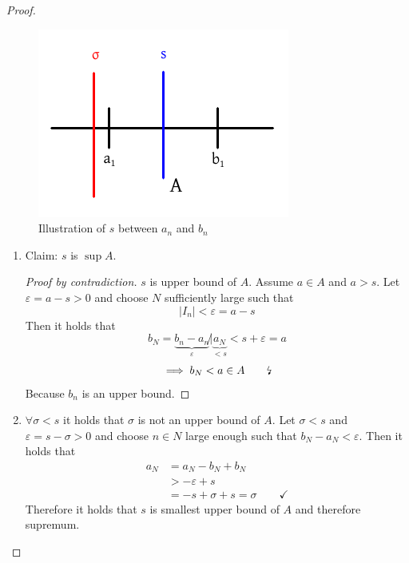 \documentclass[a4paper,landscape,twocolumn]{article}
\theoremstyle{definition}
\newcommand\abs[1]{\left|#1\right|}
\begin{document}
\begin{proof}
  \begin{figure}[!h]
    \begin{center}
      \includegraphics{img/proof_interval2.pdf}
      \caption[width=200pt]{Illustration of $s$ between $a_n$ and $b_n$}
    \end{center}
  \end{figure}

  \begin{enumerate}
    \item
      Claim: $s$ is $\sup{A}$.

      \begin{proof}[Proof by contradiction]
        $s$ is upper bound of $A$. Assume $a \in A$ and $a > s$.
        Let $\varepsilon = a - s > 0$ and choose $N$ sufficiently large such that
        \[ \abs{I_n} < \varepsilon = a - s \]
        Then it holds that
        \[
            b_N
            = \underbrace{b_n - a_n}_{\varepsilon} \not|
            \underbrace{a_N}_{< s} < s + \varepsilon
            = a
        \]
        \[ \implies b_N < a \in A \qquad\text\lightning \]
        Because $b_n$ is an upper bound.
      \end{proof}

    \item
      $\forall \sigma < s$ it holds that $\sigma$ is not an upper bound of $A$.
      Let $\sigma < s$ and $\varepsilon = s - \sigma > 0$ and choose $n \in N$
      large enough such that $b_N - a_N < \varepsilon$. Then it holds that
      \begin{align*}
        a_N &= a_N - b_N + b_N \\
            &> -\varepsilon + s \\
            &= -s + \sigma + s = \sigma \qquad \mathbf\checkmark
      \end{align*}
      Therefore it holds that $s$ is smallest upper bound of $A$ and therefore
      supremum.
  \end{enumerate}
\end{proof}
\end{document}
